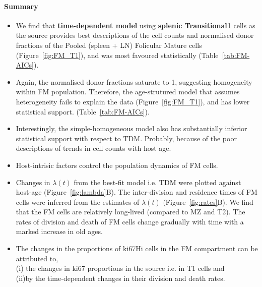 \documentclass[11pt]{article}
\begin{document}
\paragraph{Summary}
\begin{itemize}
	\item We find that \textbf{time-dependent model} using \textbf{splenic Transitional1} cells as the source provides best descriptions of the cell counts and normalised donor fractions of the Pooled (spleen + LN) Folicular Mature cells (Figure~\ref{fig:FM_T1}), and was most favoured statistically (Table~\ref{tab:FM-AICs}).
	
	\item Again, the normalised donor fractions saturate to 1, suggesting homogeneity within FM population. Therefore, the age-strutured model that assumes heterogeneity fails to explain the data (Figure~\ref{fig:FM_T1}), and has lower statistical support. (Table~\ref{tab:FM-AICs}). 
	
	\item Interestingly, the simple-homogeneous model also has substantially inferior statistical support with respect to TDM. Probably, because of the poor descriptions of trends in cell counts with host age. 
	
	\item Host-intrisic factors control the population dynamics of FM cells.
	
	\item Changes in $\lambda(t)$ from the best-fit model i.e. TDM were plotted against host-age (Figure~\ref{fig:lambda}B). The inter-division and residence times of FM cells were inferred from the estimates of $\lambda(t)$ (Figure~\ref{fig:rates}B). We find that the FM cells are relatively long-lived (compared to MZ and T2).
	The rates of division and death of FM cells change gradually with time with a marked increase in old ages.
	
	\item The changes in the proportions of ki67Hi cells in the FM compartment can be attributed to, \\
	(i) the changes in ki67 proportions in the source i.e. in T1 cells and \\
	(ii)by the time-dependent changes in their division and death rates.
	
	
\end{itemize}
\end{document}
